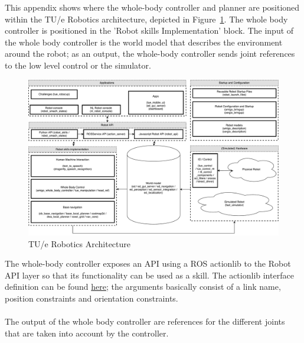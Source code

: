 This appendix shows where the whole-body controller and planner are positioned within the TU/e Robotics architecture, depicted in Figure~\ref{app:architecture}. The whole body controller is positioned in the 'Robot skills Implementation' block. The input of the whole body controller is the world model that describes the environment around the robot; as an output, the whole-body controller sends joint references to the low level control or the simulator.
\begin{figure}[ht]
    \centering
    \includegraphics[width = 1.0\linewidth]{pics/architecture.pdf}
    \caption{TU/e Robotics Architecture}
    \label{app:architecture}
\end{figure}
The whole-body controller exposes an API using a ROS actionlib to the Robot API layer so that its functionality can be used as a skill. The actionlib interface definition can be found \href{https://github.com/tue-robotics/amigo_whole_body_controller/blob/master/action/ArmTask.action}{here}; the arguments basically consist of a link name, position constraints and orientation constraints.
\\\\
The output of the whole body controller	are references for the different joints that are taken into account by the controller.
